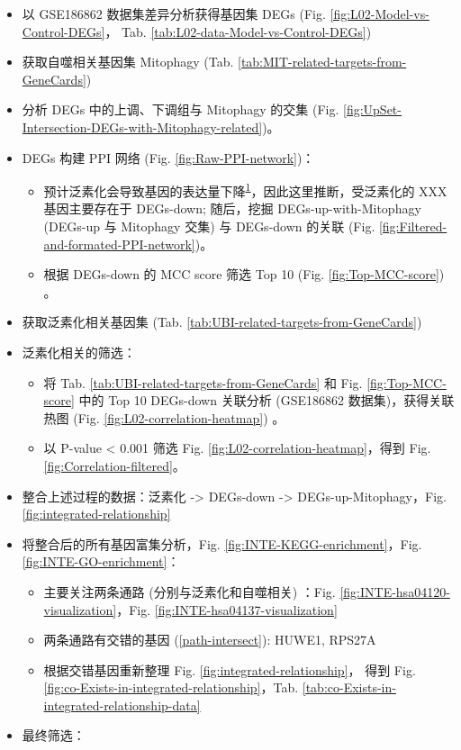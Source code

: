 \documentclass[
]{article}
\providecommand{\tightlist}{%
  \setlength{\itemsep}{0pt}\setlength{\parskip}{0pt}}
\begin{document}
\begin{itemize}
\tightlist
\item
  以 GSE186862 数据集差异分析获得基因集 DEGs (Fig. \ref{fig:L02-Model-vs-Control-DEGs}，
  Tab. \ref{tab:L02-data-Model-vs-Control-DEGs})
\item
  获取自噬相关基因集 Mitophagy (Tab. \ref{tab:MIT-related-targets-from-GeneCards})
\item
  分析 DEGs 中的上调、下调组与 Mitophagy 的交集 (Fig. \ref{fig:UpSet-Intersection-DEGs-with-Mitophagy-related})。
\item
  DEGs 构建 PPI 网络 (Fig. \ref{fig:Raw-PPI-network})：

  \begin{itemize}
  \tightlist
  \item
    预计泛素化会导致基因的表达量下降\textsuperscript{\protect\hyperlink{ref-UbiquitinationPopovi2014}{1}}，因此这里推断，受泛素化的 XXX 基因主要存在于 DEGs-down;
    随后，挖掘 DEGs-up-with-Mitophagy (DEGs-up 与 Mitophagy 交集) 与 DEGs-down 的关联
    (Fig. \ref{fig:Filtered-and-formated-PPI-network})。
  \item
    根据 DEGs-down 的 MCC score 筛选 Top 10 (Fig. \ref{fig:Top-MCC-score}) 。
  \end{itemize}
\item
  获取泛素化相关基因集 (Tab. \ref{tab:UBI-related-targets-from-GeneCards})
\item
  泛素化相关的筛选：

  \begin{itemize}
  \tightlist
  \item
    将 Tab. \ref{tab:UBI-related-targets-from-GeneCards} 和 Fig. \ref{fig:Top-MCC-score} 中的 Top 10 DEGs-down 关联分析 (GSE186862 数据集)，获得关联热图 (Fig. \ref{fig:L02-correlation-heatmap}) 。
  \item
    以 P-value \textless{} 0.001 筛选 Fig. \ref{fig:L02-correlation-heatmap}，得到 Fig. \ref{fig:Correlation-filtered}。
  \end{itemize}
\item
  整合上述过程的数据：泛素化 -\textgreater{} DEGs-down -\textgreater{} DEGs-up-Mitophagy，Fig. \ref{fig:integrated-relationship}
\item
  将整合后的所有基因富集分析，Fig. \ref{fig:INTE-KEGG-enrichment}，Fig. \ref{fig:INTE-GO-enrichment}：

  \begin{itemize}
  \tightlist
  \item
    主要关注两条通路 (分别与泛素化和自噬相关) ：Fig. \ref{fig:INTE-hsa04120-visualization}，Fig. \ref{fig:INTE-hsa04137-visualization}
  \item
    两条通路有交错的基因 (\ref{path-intersect}): HUWE1, RPS27A
  \item
    根据交错基因重新整理 Fig. \ref{fig:integrated-relationship}，
    得到 Fig. \ref{fig:co-Exists-in-integrated-relationship}，Tab. \ref{tab:co-Exists-in-integrated-relationship-data}
  \end{itemize}
\item
  最终筛选：


\end{itemize}
\end{document}
